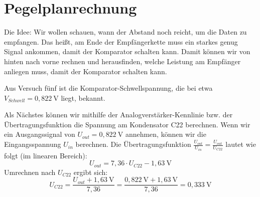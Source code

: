 \section{Pegelplanrechnung}
Die Idee: Wir wollen schauen, wann der Abstand noch reicht, um die Daten zu empfangen.
Das heißt, am Ende der Empfängerkette muss ein starkes genug Signal ankommen, damit der Komparator schalten kann.
Damit können wir von hinten nach vorne rechnen und herausfinden, welche Leistung am Empfänger anliegen muss,
damit der Komparator schalten kann.

Aus Versuch fünf ist die Komparator-Schwellspannung, die bei etwa $V_{Schwell} = 0{,}822~\mathrm{V}$ liegt, bekannt.

Als Nächstes können wir mithilfe der Analogverstärker-Kennlinie bzw. der Übertragungsfunktion die Spannung am Kondensator C22 berechnen.
Wenn wir ein Ausgangssignal von $U_{out} = 0{,}822~\mathrm{V}$ annehmen, können wir die Eingangsspannung $U_{in}$ berechnen.
Die Übertragungsfunktion $\frac{U_{out}}{U_{in}}=\frac{U_{out}}{U_{C22}}$ lautet wie folgt (im linearen Bereich):
\begin{equation}
    U_{out} = 7{,}36 \cdot U_{C22} -1{,}63~\mathrm{V}
\end{equation}
Umrechnen nach $U_{C22}$ ergibt sich:
\begin{equation}
    U_{C22} = \frac{U_{out} + 1{,}63~\mathrm{V}}{7{,}36} = \frac{0{,}822~\mathrm{V} + 1{,}63~\mathrm{V}}{7{,}36} = 0{,}333~\mathrm{V}
\end{equation}

